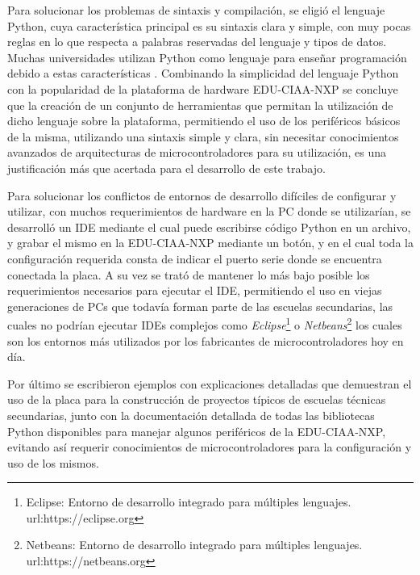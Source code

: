 Para solucionar los problemas de sintaxis y compilación, se eligió el lenguaje Python, cuya característica principal es su sintaxis clara y simple, con muy pocas reglas en lo que respecta a palabras reservadas del lenguaje y tipos de datos. Muchas universidades utilizan Python como lenguaje para enseñar programación debido a estas características \cite{papereducacion}. Combinando la simplicidad del lenguaje Python con la popularidad de la plataforma de hardware EDU-CIAA-NXP se concluye que la creación de un conjunto de herramientas que permitan la utilización de dicho lenguaje sobre la plataforma, permitiendo el uso de los periféricos básicos de la misma, utilizando una sintaxis simple y clara, sin necesitar conocimientos avanzados de arquitecturas de microcontroladores para su utilización, es una justificación más que acertada para el desarrollo de este trabajo.

Para solucionar los conflictos de entornos de desarrollo difíciles de configurar y utilizar, con muchos requerimientos de hardware en la PC donde se utilizarían, se desarrolló un IDE mediante el cual puede escribirse código Python en un archivo, y grabar el mismo en la EDU-CIAA-NXP mediante un botón, y en el cual toda la configuración requerida consta de indicar el puerto serie donde se encuentra conectada la placa. A su vez se trató de mantener lo más bajo posible los requerimientos necesarios para ejecutar el IDE, permitiendo el uso en viejas generaciones de PCs que todavía forman parte de las escuelas secundarias, las cuales no podrían ejecutar IDEs complejos como \textit{Eclipse}\footnote{Eclipse: Entorno de desarrollo integrado para múltiples lenguajes. url:https://eclipse.org} o \textit{Netbeans}\footnote{Netbeans: Entorno de desarrollo integrado para múltiples lenguajes. url:https://netbeans.org} los cuales son los entornos más utilizados por los fabricantes de microcontroladores hoy en día.

Por último se escribieron ejemplos con explicaciones detalladas que demuestran el uso de la placa para la construcción de proyectos típicos de escuelas técnicas secundarias, junto con la documentación detallada de todas las bibliotecas Python disponibles para manejar algunos periféricos de la EDU-CIAA-NXP, evitando así requerir conocimientos de microcontroladores para la configuración y uso de los mismos.






